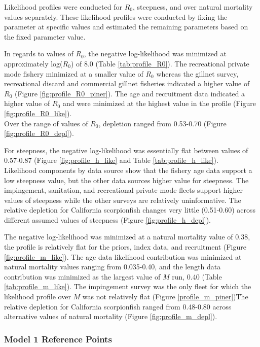 \documentclass[12pt,]{article}
\begin{document}
Likelihood profiles were conducted for \(R_0\), steepness, and over
natural mortality values separately. These likelihood profiles were
conducted by fixing the parameter at specific values and estimated the
remaining parameters based on the fixed parameter value.

In regards to values of \(R_0\), the negative log-likelihood was
minimized at approximately log(\(R_0\)) of 8.0 (Table
\ref{tab:profile_R0}). The recreational private mode fishery minimized
at a smaller value of \(R_0\) whereas the gillnet survey, recreational
discard and commercial gillnet fisheries indicated a higher value of
\(R_0\) (Figure \ref{fig:profile_R0_piner}). The age and recruitment
data indicated a higher value of \(R_0\) and were minimized at the
highest value in the profile (Figure \ref{fig:profile_R0_like}).\\
Over the range of values of \(R_0\), depletion ranged from 0.53-0.70
(Figure \ref{fig:profile_R0_depl}).

For steepness, the negative log-likelihood was essentially flat between
values of 0.57-0.87 (Figure \ref{fig:profile_h_like} and Table
\ref{tab:profile_h_like}).\\
Likelihood components by data source show that the fishery age data
support a low steepness value, but the other data sources higher value
for steepness. The impingement, sanitation, and recreational private
mode fleets support higher values of steepness while the other surveys
are relatively uninformative. The relative depletion for California
scorpionfish changes very little (0.51-0.60) across different assumed
values of steepness (Figure \ref{fig:profile_h_depl}).

The negative log-likelihood was minimized at a natural mortality value
of 0.38, the profile is relatively flat for the priors, index data, and
recruitment (Figure \ref{fig:profile_m_like}). The age data likelihood
contribution was minimized at natural mortality values ranging from
0.035-0.40, and the length data contribution was minimized as the
largest value of \(M\) run, 0.40 (Table \ref{tab:profile_m_like}). The
impingement survey was the only fleet for which the likelihood profile
over \(M\) was not relatively flat (Figure \ref{profile_m_piner})The
relative depletion for California scorpionfish ranged from 0.48-0.80
across alternative values of natural mortality (Figure
\ref{fig:profile_m_depl}).

\subsubsection{Model 1 Reference Points}\label{model-1-reference-points}
\end{document}

